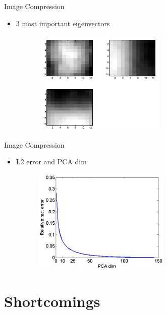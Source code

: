\documentclass[serif, aspectratio=169]{beamer}
\begin{document}
\begin{frame}{Image Compression}
       \begin{itemize}
           \item 3 most important eigenvectors
       \end{itemize}
        \begin{figure}[htpb]
            \begin{center}
                \includegraphics[width=8cm, height=5cm]{pic/3_most.JPG}
            \end{center}
        \end{figure}
\end{frame}


\begin{frame}{Image Compression}
       \begin{itemize}
           \item L2 error and PCA dim
       \end{itemize}
        \begin{figure}[htpb]
            \begin{center}
                \includegraphics[width=8cm, height=5cm]{pic/error.JPG}
            \end{center}
        \end{figure}
\end{frame}

\section{Shortcomings}
\end{document}
